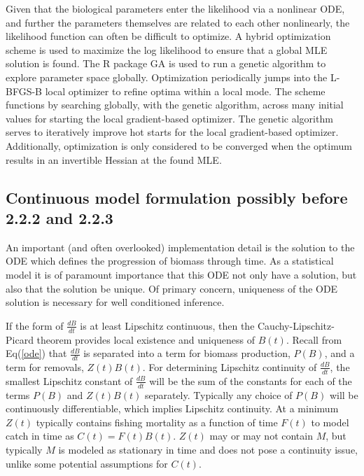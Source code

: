 %
Given that the biological parameters enter the likelihood via a nonlinear ODE,
and further the parameters themselves are related to each other nonlinearly,
the likelihood function can often be difficult to optimize. A hybrid optimization
scheme is used to maximize the log likelihood to ensure that a global MLE solution
is found. The R package GA \cite{scrucca_ga_2013, scrucca_extensions_2017} is
used to run a genetic algorithm to explore parameter space globally.
Optimization periodically jumps into the L-BFGS-B local optimizer to refine
optima within a local mode. The scheme functions by searching globally, with the genetic
algorithm, across many initial values for starting the local gradient-based optimizer.
The genetic algorithm serves to iteratively improve hot starts for the local
gradient-based optimizer. Additionally, optimization is only considered to be converged
when the optimum results in an invertible Hessian at the found MLE.

%
\subsection{Continuous model formulation {\color{red}possibly before 2.2.2 and 2.2.3} }

%
An important (and often overlooked) implementation detail is the solution to the
ODE which defines the progression of biomass through time. %
As a statistical model it is of paramount importance that this ODE not only have a
solution, but also that the solution be unique. Of primary concern, uniqueness
of the ODE solution is necessary for well conditioned inference. %

%
If the form of $\frac{dB}{dt}$ is at least Lipschitz continuous, then the
Cauchy-Lipschitz-Picard theorem provides local existence and uniqueness of
$B(t)$. %
Recall from Eq(\ref{ode}) that $\frac{dB}{dt}$ is separated into
a term for biomass production, $P(B)$, and a term for removals, $Z(t)B(t)$.
For determining Lipschitz continuity of $\frac{dB}{dt}$,
the smallest Lipschitz constant of $\frac{dB}{dt}$ will be the sum of the
constants for each of the terms $P(B)$ and $Z(t)B(t)$ separately. Typically any
choice of $P(B)$ will be continuously differentiable, which implies Lipschitz
continuity. %
At a minimum $Z(t)$ typically contains fishing mortality as a function of time
$F(t)$ to model catch in time as $C(t)=F(t)B(t)$. $Z(t)$ may or may not contain
$M$, but typically $M$ is modeled as stationary in time and does not pose a
continuity issue, unlike some potential assumptions for $C(t)$.

